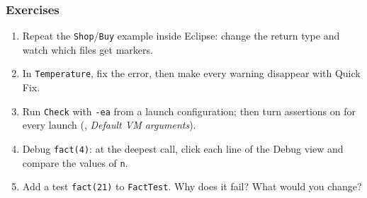 \documentclass[aspectratio=169,10pt,compress]{beamer}
\begin{document}
\begin{frame}[t,fragile] \frametitle{Exercises}
  \begin{enumerate}\small
    \item Repeat the \texttt{Shop}/\texttt{Buy} example inside Eclipse: change the return type and watch which files get markers.
    \item In \texttt{Temperature}, fix the error, then make every warning disappear with Quick Fix.
    \item Run \texttt{Check} with \texttt{-ea} from a launch configuration; then turn assertions on for every launch
          (, \emph{Default VM arguments}).
    \item Debug \texttt{fact(4)}: at the deepest call, click each line of the Debug view and compare the values of \texttt{n}.
    \item Add a test \texttt{fact(21)} to \texttt{FactTest}. Why does it fail? What would you change?
  \end{enumerate}
\end{frame}




\begin{frame}[t,fragile]
	\begin{center}
		\vspace{4cm}
	\end{center}
\end{frame}
\end{document}
